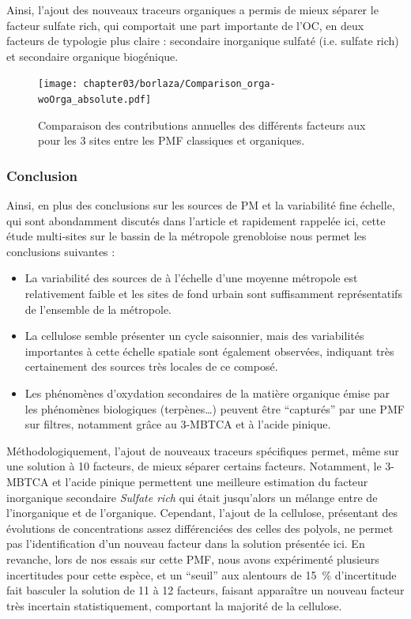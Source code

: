 Ainsi, l'ajout des nouveaux traceurs organiques a permis de mieux séparer le facteur
sulfate rich, qui comportait une part importante de l'OC, en deux facteurs de typologie
plus claire : secondaire inorganique sulfaté (i.e. sulfate rich) et secondaire organique
biogénique.

\begin{figure}[ht]
    \centering
    \texttt{[image: chapter03/borlaza/Comparison\_orga-woOrga\_absolute.pdf]}
    \caption{Comparaison des contributions annuelles des différents facteurs aux \PMdix{}
    pour les 3 sites entre les PMF classiques et organiques.}%
    \label{fig:chapter03/borlaza/Comparison_orga-woOrga_absolute}
\end{figure}

\subsubsection{Conclusion}%
\label{ssub:conclusion_organique}

Ainsi, en plus des conclusions sur les sources de PM et la variabilité fine échelle, qui
sont abondamment discutés dans l'article et rapidement rappelée ici, cette étude
multi-sites sur le bassin de la métropole grenobloise nous permet les conclusions
suivantes :
\begin{itemize}
    \item La variabilité des sources de \PMdix{} à l'échelle d'une moyenne métropole est
        relativement faible et les sites de fond urbain sont suffisamment représentatifs
        de l'ensemble de la métropole.
    \item La cellulose semble présenter un cycle saisonnier, mais des variabilités
        importantes à cette échelle spatiale sont également observées, indiquant très
        certainement des sources très locales de ce composé.
    \item Les phénomènes d'oxydation secondaires de la matière organique émise par les
        phénomènes biologiques (terpènes…) peuvent être ``capturés'' par une PMF sur
        filtres, notamment grâce au 3-MBTCA et à l'acide pinique.
\end{itemize}

Méthodologiquement, l'ajout de nouveaux traceurs spécifiques permet, même sur une
solution à 10 facteurs, de mieux séparer certains facteurs. Notamment, le 3-MBTCA et
l'acide pinique permettent une meilleure estimation du facteur inorganique secondaire
\textit{Sulfate rich} qui était jusqu'alors un mélange entre de l'inorganique et de
l'organique.  Cependant, l'ajout de la cellulose, présentant des évolutions de
concentrations assez différenciées des celles des polyols, ne permet pas l'identification d'un nouveau facteur
dans la solution présentée ici. En revanche, lors de nos essais sur cette PMF, nous avons
expérimenté plusieurs incertitudes pour cette espèce, et un ``seuil'' aux alentours de
\SI{15}{\percent} d'incertitude fait basculer la solution de 11 à 12 facteurs,
faisant apparaître un nouveau facteur très incertain statistiquement, comportant la
majorité de la cellulose.

